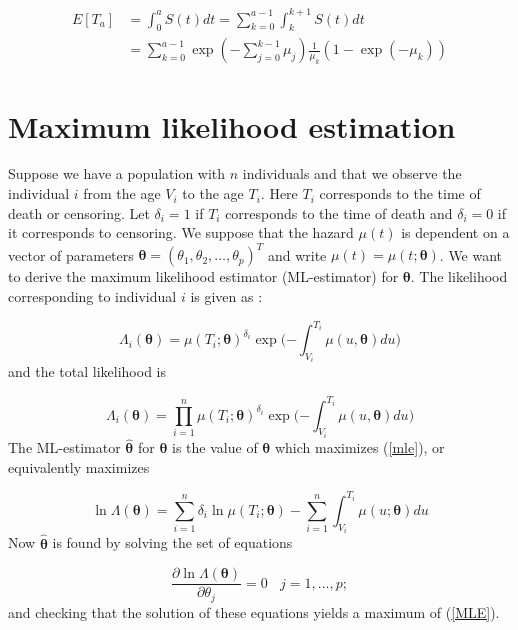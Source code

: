 \begin{align*}
    E[T_{a}] &= \int_{0}^{a} S(t) dt = \sum\limits_{k=0}^{a-1} \int_{k}^{k+1} S(t) dt \\
              &=\sum\limits_{k=0}^{a-1}  \exp{(-\sum\limits_{j=0}^{k-1}\mu_{j})}  \frac{1}{\mu_{k}}(1 - \exp{(-\mu_{k})})
\end{align*}



\section{Maximum likelihood estimation}

Suppose we have a population with $n$ individuals and that we observe the individual $i$ from the age $V_{i}$ to the age $T_{i}$. 
Here $T_{i}$ corresponds to the time of death or censoring.
Let $\delta_{i} = 1 $ if $T_{i}$ corresponds to the time of death and $\delta_{i} = 0 $ if it corresponds to censoring.
We suppose that the hazard $\mu(t)$ is dependent on a vector of parameters $\bm{\theta} =(\theta_{1} ,\theta_{2} ,\dots,\theta_{p} )^T $ and write $\mu(t) = \mu(t;\bm{\theta}) $.
We want to derive the maximum likelihood estimator (ML-estimator) for $\bm{\theta}$.
The likelihood corresponding to individual $i$ is given as : 


\begin{equation}
         \Lambda_{i}(\bm{\theta}) = \mu(T_{i};\bm{\theta})^{\delta_{i}} \exp{(-\int_{V_{i}}^{T_{i}} \mu(u,\bm{\theta}) du})
         \label{mle}
\end{equation}
and the total likelihood is


\begin{equation}
         \Lambda_{i}(\bm{\theta}) = \prod\limits_{i=1}^n \mu(T_{i};\bm{\theta})^{\delta_{i}} \exp{(-\int_{V_{i}}^{T_{i}} \mu(u,\bm{\theta})du}) 
\end{equation}
The ML-estimator $\hat{\bm{\theta}}$ for $\bm{\theta}$ is the value of $\bm{\theta}$ which maximizes (\ref{mle}), or equivalently maximizes



\begin{equation}
    \ln\Lambda(\bm{\theta}) = \sum\limits_{i=1}^n \delta_{i} \ln \mu(T_{i};\bm{\theta})
    - \sum\limits_{i=1}^n \int_{V_i}^{T_i} \mu(u;\bm{\theta}) du
    \label{MLE}
\end{equation}
Now $\hat{\bm{\theta}}$ is found by solving the set of equations


\begin{equation*}
   \frac{\partial \ln \Lambda(\bm{\theta})}{\partial\theta_{j}}
    = 0  
 ~~~~ j = 1,...,p;  
\end{equation*}
and checking that the solution of these equations yields a maximum of (\ref{MLE}).

